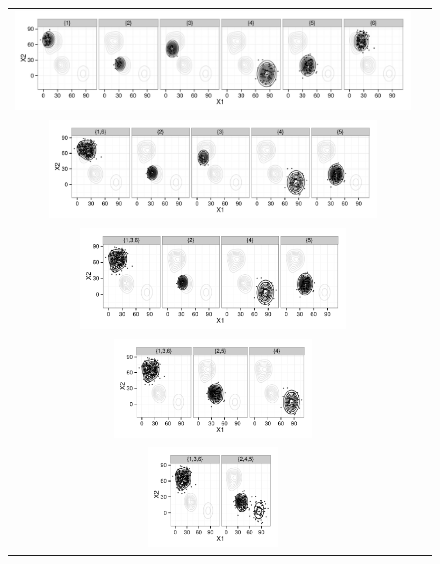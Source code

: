 \documentclass[10pt, a4paper]{article}
\begin{document}
\begin{figure}[thbp]
\begin{center}
\begin{tabular}{cc}
  \includegraphics[trim=0cm 0cm 0cm 0cm,width=\textwidth]{partition-example-part6.pdf} \\
    \includegraphics[trim=0cm 0cm 0cm 0cm,width=0.83\textwidth]{partition-example-part5.pdf} \\
      \includegraphics[trim=0cm 0cm 0cm 0cm,width=0.67\textwidth]{partition-example-part4.pdf} \\
        \includegraphics[trim=0cm 0cm 0cm 0cm,width=0.5\textwidth]{partition-example-part3a.pdf} \\
          \includegraphics[trim=0cm 0cm 0cm 0cm,width=0.33\textwidth]{partition-example-part2.pdf} \\

\end{tabular}
\end{center}
\end{figure}
\end{document}
